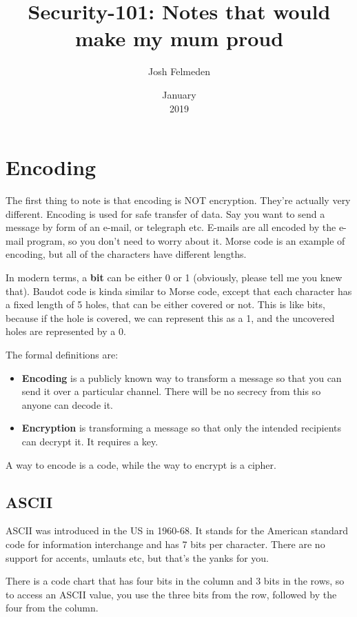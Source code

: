 \documentclass[11pt,a4paper,titlepage]{scrartcl}
\author{Josh Felmeden}
\date{January \\ 2019}
\title{Security-101: Notes that would make my mum proud}
\begin{document}
\maketitle
\tableofcontents 
\newpage
{}

\section{Encoding}%
\label{sec:Encoding}
The first thing to note is that encoding is NOT encryption. They're
actually very different. Encoding is used for safe transfer of data. Say
you want to send a message by form of an e-mail, or telegraph etc. E-mails
are all encoded by the e-mail program, so you don't need to worry about
it. Morse code is an example of encoding, but all of the characters have
different lengths.

In modern terms, a \textbf{bit} can be either 0 or 1 (obviously, please
tell me you knew that). Baudot code is kinda similar to Morse code, except
that each character has a fixed length of 5 holes, that can be either
covered or not. This is like bits, because if the hole is covered, we can
represent this as a 1, and the uncovered holes are represented by a 0.

The formal definitions are:
\begin{itemize}
    \item \textbf{Encoding} is a publicly known way to transform a message
        so that you can send it over a particular channel. There will be
        no secrecy from this so anyone can decode it.
    \item \textbf{Encryption} is transforming a message so that only
        the intended recipients can decrypt it. It requires a key.
\end{itemize}

A way to encode is a code, while the way to encrypt is a cipher.

\subsection{ASCII}%
\label{sub:ASCII}

ASCII was introduced in the US in 1960-68. It stands for the American
standard code for information interchange and has 7 bits per character.
There are no support for accents, umlauts etc, but that's the yanks for
you.

There is a code chart that has four bits in the column and 3 bits in the
rows, so to access an ASCII value, you use the three bits from the row,
followed by the four from the column. 
\end{document}
